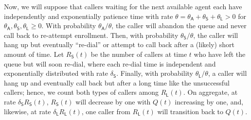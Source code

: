 \documentclass[manuscript,screen,authorversion]{acmart}
\begin{document}
Now, we will suppose that callers waiting for the next available agent each have independently and exponentially patience time with rate $\theta = \theta_\mathsf{A} + \theta_\mathsf{S} + \theta_\mathsf{L} > 0$ for $\theta_\mathsf{A}, \theta_\mathsf{S}, \theta_\mathsf{L} \geq 0$. With probability $\theta_\mathsf{A}/\theta$, the caller will abandon the queue and never call back to re-attempt enrollment. Then, with probability $\theta_\mathsf{S}/\theta$, the caller will hang up but eventually ``re-dial'' or attempt to call back after a (likely) short amount of time. Let $R_\mathsf{S}(t)$ be the number of callers at time $t$ who have left the queue but will soon re-dial, where each re-dial time is independent and exponentially distributed with rate $\delta_\mathsf{S}$. Finally, with probability $\theta_\mathsf{L}/\theta$, a caller will hang up and eventually call back but after a long time like the unsuccessful callers; hence, we count both types of callers among $R_\mathsf{L}(t)$. On aggregate, at rate $\delta_\mathsf{S} R_\mathsf{S}(t)$, $R_\mathsf{S}(t)$ will decrease by one with $Q(t)$ increasing by one, and, likewise, at rate $\delta_\mathsf{L} R_\mathsf{L}(t)$, one caller from $R_\mathsf{L}(t)$ will transition back to $Q(t)$.
\end{document}
